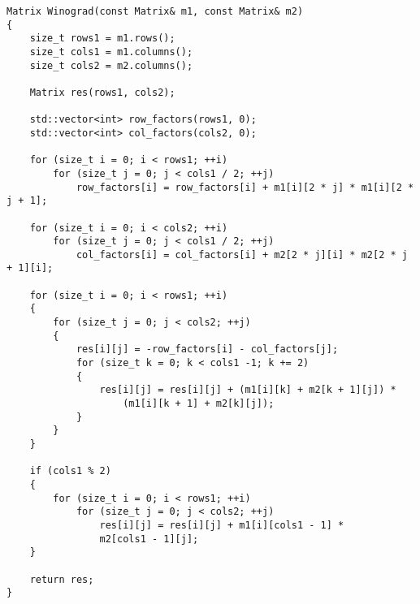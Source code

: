\begin{center}
\captionsetup{justification=raggedright,singlelinecheck=off}
\begin{lstlisting}[label=lst:lev_table,caption=Алгоритм Винограда]
Matrix Winograd(const Matrix& m1, const Matrix& m2)
{
    size_t rows1 = m1.rows();
    size_t cols1 = m1.columns();
    size_t cols2 = m2.columns();

    Matrix res(rows1, cols2);

    std::vector<int> row_factors(rows1, 0);
    std::vector<int> col_factors(cols2, 0);

    for (size_t i = 0; i < rows1; ++i)
        for (size_t j = 0; j < cols1 / 2; ++j)
            row_factors[i] = row_factors[i] + m1[i][2 * j] * m1[i][2 * j + 1];

    for (size_t i = 0; i < cols2; ++i)
        for (size_t j = 0; j < cols1 / 2; ++j)
            col_factors[i] = col_factors[i] + m2[2 * j][i] * m2[2 * j + 1][i];

    for (size_t i = 0; i < rows1; ++i)
    {
        for (size_t j = 0; j < cols2; ++j)
        {
            res[i][j] = -row_factors[i] - col_factors[j];
            for (size_t k = 0; k < cols1 -1; k += 2)
            {
                res[i][j] = res[i][j] + (m1[i][k] + m2[k + 1][j]) *
                    (m1[i][k + 1] + m2[k][j]);
            }
        }
    }

    if (cols1 % 2)
    {
        for (size_t i = 0; i < rows1; ++i)
            for (size_t j = 0; j < cols2; ++j)
                res[i][j] = res[i][j] + m1[i][cols1 - 1] *
                m2[cols1 - 1][j];
    }

    return res;
}
\end{lstlisting}
\end{center}

